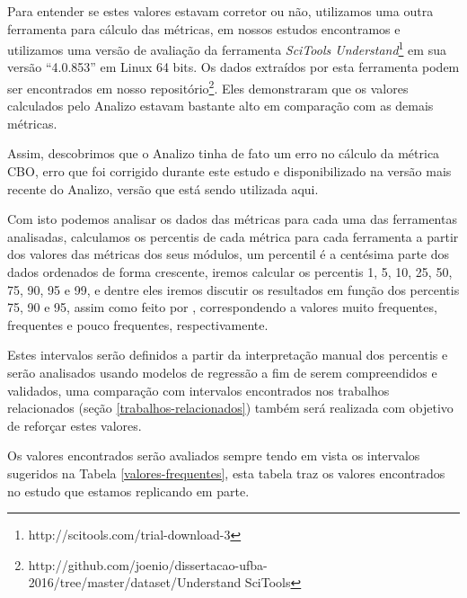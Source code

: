 Para entender se estes valores estavam corretor ou não, utilizamos uma outra
ferramenta para cálculo das métricas, em nossos estudos encontramos e
utilizamos uma versão de avaliação da ferramenta {\it SciTools
Understand}\footnote{http://scitools.com/trial-download-3} em sua versão
``4.0.853'' em Linux 64 bits. Os dados extraídos por esta ferramenta podem ser
encontrados em nosso
repositório\footnote{http://github.com/joenio/dissertacao-ufba-2016/tree/master/dataset/Understand
SciTools}. Eles demonstraram que os valores calculados pelo Analizo estavam
bastante alto em comparação com as demais métricas.

Assim, descobrimos que o Analizo tinha de fato um erro no cálculo da métrica
CBO, erro que foi corrigido durante este estudo e disponibilizado na versão
mais recente do Analizo, versão que está sendo utilizada aqui.

Com isto podemos analisar os dados das métricas para cada uma das ferramentas analisadas,
calculamos os percentis de cada métrica para cada ferramenta a partir dos
valores das métricas dos seus módulos, um percentil é a centésima parte dos
dados ordenados de forma crescente, iremos calcular os percentis 1, 5, 10, 25,
50, 75, 90, 95 e 99, e dentre eles iremos discutir os resultados em função dos
percentis 75, 90 e 95, assim como feito por ,
correspondendo a valores muito frequentes, frequentes e pouco frequentes,
respectivamente.

Estes intervalos serão
definidos a partir da interpretação manual dos percentis e serão analisados
usando modelos de regressão a fim de serem compreendidos e validados, uma
comparação com intervalos encontrados nos trabalhos relacionados (seção
\ref{trabalhos-relacionados}) também será realizada com objetivo de reforçar
estes valores.

Os valores encontrados serão avaliados sempre tendo em vista os intervalos
sugeridos na Tabela \ref{valores-frequentes}, esta tabela traz os valores encontrados
no estudo que estamos replicando em parte\cite{Meirelles2013}.

